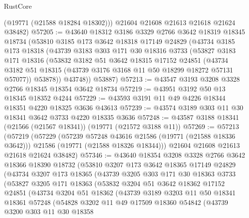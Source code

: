 \begin{lexlean}{RustCore}
\begin{coremodule}
        (@19771 (@21588 @18284 @18302)))
      @21604
      @21608
      @21613
      @21618
      @21624
      @38482)
@57205 := @43640
    @18312
    @3186
    @3329
    @2766
    @3642
    @18319
    @18345
    @18734
    (@53810
      @3185
      @173
      @3642
      @18318
      @17149
      @24829
      (@43734
        @3185
        @173
        @18318
        (@43739
          @3183
          @303
          @171
          @30
          @18316
          @3733
          (@53827
            @3183
            @171
            @18316
            (@53832
              @3182
              @51
              @3642
              @18315
              @17152
              @24851
              (@43734 @3182 @51 @18315 (@43739 @3176 @3168 @11 @50 @18299 @18272 @57131 @57077))
              @53878))
          @43748))
      @53887)
@57213 := @43547 @3193 @3208 @3328 @2766 @18345 @18354 @3642 @18734
@57219 := @43951 @3192 @50 @13 @18345 @18352 @4244
@57229 := @43593 @3191 @11 @49 @4226 @18344 @18351 @4220 @18325 @3636 @43613
@57239 := @43574 @3189 @303 @11 @30 @18341 @3642 @3733 @4220 @18335 @3636
@57248 := @43587 @3188 @18341 (@21566 (@21567 @18341)) (@19771 (@21572 @3188 @11))
@57269 := @57213
    (@57219
      (@57229
        (@57239 @57248 @43616 @21586 (@19771 (@21588 @18336 @3642)))
        @21586
        (@19771 (@21588 @18326 @18344)))
      @21604
      @21608
      @21613
      @21618
      @21624
      @38482)
@57346 := @43640
    @18354
    @3208
    @3328
    @2766
    @3642
    @18366
    @18390
    @18732
    (@53810
      @3207
      @173
      @3642
      @18365
      @17149
      @24829
      (@43734
        @3207
        @173
        @18365
        (@43739
          @3205
          @303
          @171
          @30
          @18363
          @3733
          (@53827
            @3205
            @171
            @18363
            (@53832
              @3204
              @51
              @3642
              @18362
              @17152
              @24851
              (@43734
                @3204
                @51
                @18362
                (@43739
                  @3189
                  @3203
                  @11
                  @50
                  @18341
                  @18361
                  @57248
                  (@54828
                    @3202
                    @11
                    @49
                    @17509
                    @18360
                    @54842
                    (@43739
                      @3200
                      @303
                      @11
                      @30
                      @18358

\end{coremodule}
\end{lexlean}

